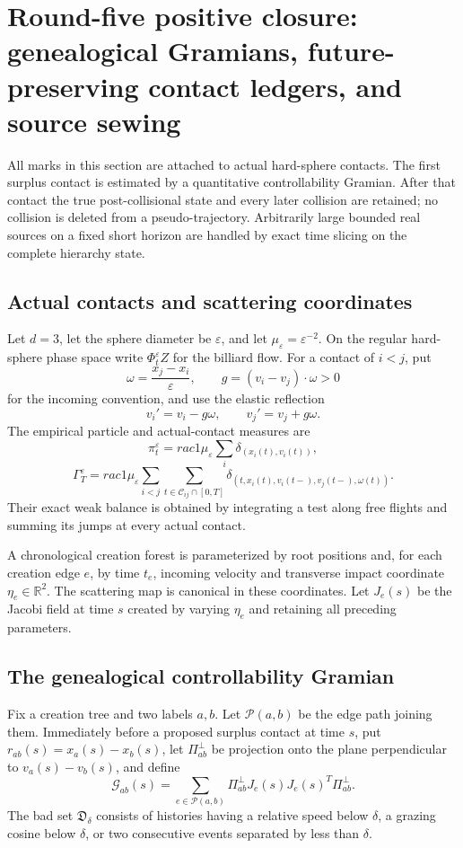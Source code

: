 \section{Round-five positive closure: genealogical Gramians, future-preserving contact ledgers, and source sewing}
\label{sec:r5-b2}

All marks in this section are attached to actual hard-sphere contacts.  The
first surplus contact is estimated by a quantitative controllability Gramian.
After that contact the true post-collisional state and every later collision
are retained; no collision is deleted from a pseudo-trajectory.  Arbitrarily
large bounded real sources on a fixed short horizon are handled by exact time
slicing on the complete hierarchy state.

\subsection{Actual contacts and scattering coordinates}

Let \(d=3\), let the sphere diameter be \(\varepsilon\), and let
\(\mu_\varepsilon=\varepsilon^{-2}\).  On the regular hard-sphere phase space
write \(\Phi_t^\varepsilon Z\) for the billiard flow.  For a contact of
\(i<j\), put
\[
 \omega=\frac{x_j-x_i}{\varepsilon},
 \qquad g=(v_i-v_j)\cdot\omega>0
\]
for the incoming convention, and use the elastic reflection
\[
 v_i'=v_i-g\omega,\qquad v_j'=v_j+g\omega.
\]
The empirical particle and actual-contact measures are
\[
 \pi_t^\varepsilon=rac1{\mu_\varepsilon}
 \sum_i\delta_{(x_i(t),v_i(t))},
\]
\[
 \Gamma_T^\varepsilon=rac1{\mu_\varepsilon}
 \sum_{i<j}\sum_{t\in\mathcal C_{ij}\cap[0,T]}
 \delta_{(t,x_i(t),v_i(t-),v_j(t-),\omega(t))}.
\]
Their exact weak balance is obtained by integrating a test along free flights
and summing its jumps at every actual contact.

A chronological creation forest is parameterized by root positions and, for
each creation edge \(e\), by time \(t_e\), incoming velocity and transverse
impact coordinate \(\eta_e\in\mathbb R^2\).  The scattering map is canonical
in these coordinates.  Let \(J_e(s)\) be the Jacobi field at time \(s\)
created by varying \(\eta_e\) and retaining all preceding parameters.

\subsection{The genealogical controllability Gramian}

Fix a creation tree and two labels \(a,b\).  Let \(\mathcal P(a,b)\) be the
edge path joining them.  Immediately before a proposed surplus contact at time
\(s\), put \(r_{ab}(s)=x_a(s)-x_b(s)\), let
\(\Pi_{ab}^\perp\) be projection onto the plane perpendicular to
\(v_a(s)-v_b(s)\), and define
\[
 \mathcal G_{ab}(s)=
 \sum_{e\in\mathcal P(a,b)}
 \Pi_{ab}^\perp J_e(s)J_e(s)^T\Pi_{ab}^\perp.
\]
The bad set \(\mathfrak D_\delta\) consists of histories having a relative
speed below \(\delta\), a grazing cosine below \(\delta\), or two consecutive
events separated by less than \(\delta\).

